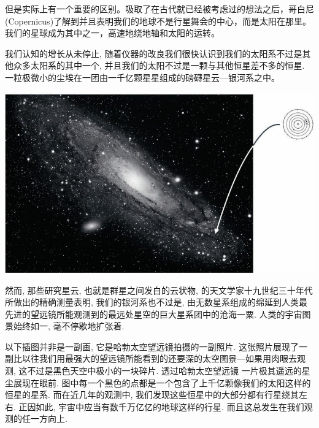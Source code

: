    但是实际上有一个重要的区别。吸取了在古代就已经被考虑过的想法之后，哥白尼(Copernicus)了解到并且表明我们的地球不是行星舞会的中心，而是太阳在那里。我们的星球成为其中之一，高速地绕地轴和太阳的运转。

   我们认知的增长从未停止, 随着仪器的改良我们很快认识到我们的太阳系不过是其他众多太阳系的其中一个, 并且我们的太阳不过是一颗与其他恒星差不多的恒星. 一粒极微小的尘埃在一团由一千亿颗星星组成的磅礴星云---银河系之中。

	\bc
	\includegraphics[width=.9\textwidth]{img/35.jpg}\\[12pt]
	\ec

   然而, 那些研究星云, 也就是群星之间发白的云状物, 的天文学家十九世纪三十年代所做出的精确测量表明, 我们的银河系也不过是, 由无数星系组成的绵延到人类最先进的望远镜所能观测到的最远处星空的巨大星系团中的沧海一粟. 人类的宇宙图景始终如一, 毫不停歇地扩张着. 

   以下插图并非是一副画, 它是哈勃太空望远镜拍摄的一副照片. 这张照片展现了一副比以往我们用最强大的望远镜所能看到的还要深的太空图景---如果用肉眼去观测, 这不过是黑色天空中极小的一块碎片. 透过哈勃太空望远镜 一片极其遥远的星尘展现在眼前. 图中每一个黑色的点都是一个包含了上千亿颗像我们的太阳这样的恒星的星系. 而在近几年的观测中, 我们发现这些恒星中的大部分都有行星绕其左右. 正因如此, 宇宙中应当有数千万亿亿的地球这样的行星. 而且这总发生在我们观测的任一方向上.

